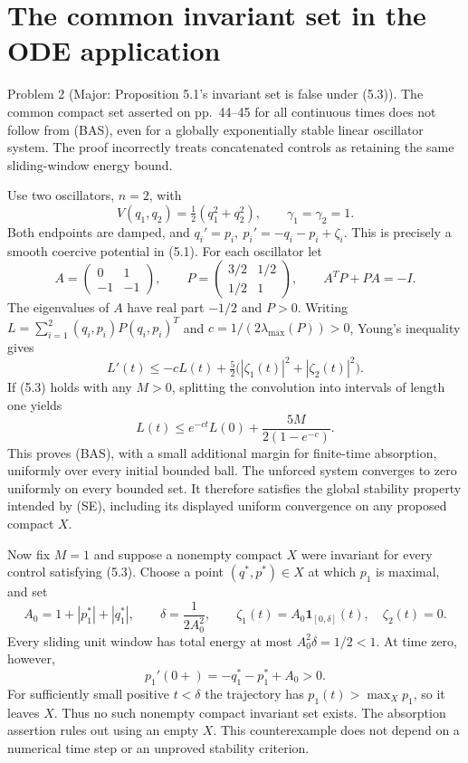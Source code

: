 \documentclass[10pt]{article}
\begin{document}
\section*{The common invariant set in the ODE application}
Problem 2 (Major: Proposition 5.1’s invariant set is false under (5.3)).  The common compact set asserted on pp. 44–45 for all continuous times does not follow from (BAS), even for a globally exponentially stable linear oscillator system. The proof incorrectly treats concatenated controls as retaining the same sliding-window energy bound.\par
Use two oscillators, \(n=2\), with \[V(q_1,q_2)=\tfrac12(q_1^2+q_2^2),\qquad \gamma_1=\gamma_2=1.\] Both endpoints are damped, and \(q_i'=p_i,\ p_i'=-q_i-p_i+\zeta_i\). This is precisely a smooth coercive potential in (5.1). For each oscillator let \[A=\begin{pmatrix}0&1\\-1&-1\end{pmatrix},\qquad
 P=\begin{pmatrix}3/2&1/2\\1/2&1\end{pmatrix},\qquad
 A^{T}P+PA=-I.\] The eigenvalues of \(A\) have real part \(-1/2\) and \(P>0\). Writing \(L=\sum_{i=1}^2(q_i,p_i)P(q_i,p_i)^T\) and \(c=1/(2\lambda_{\max}(P))>0\), Young’s inequality gives \[L'(t)\leq-cL(t)+\tfrac52\bigl(|\zeta_1(t)|^2+|\zeta_2(t)|^2\bigr).\] If (5.3) holds with any \(M>0\), splitting the convolution into intervals of length one yields \[L(t)\leq e^{-ct}L(0)+\frac{5M}{2(1-e^{-c})}.\] This proves (BAS), with a small additional margin for finite-time absorption, uniformly over every initial bounded ball. The unforced system converges to zero uniformly on every bounded set. It therefore satisfies the global stability property intended by (SE), including its displayed uniform convergence on any proposed compact \(X\).\par
Now fix \(M=1\) and suppose a nonempty compact \(X\) were invariant for every control satisfying (5.3). Choose a point \((q^*,p^*)\in X\) at which \(p_1\) is maximal, and set \[A_0=1+|p_1^*|+|q_1^*|,\qquad
 \delta=\frac1{2A_0^2},\qquad
 \zeta_1(t)=A_0\mathbf1_{[0,\delta]}(t),\quad \zeta_2(t)=0.\] Every sliding unit window has total energy at most \(A_0^2\delta=1/2<1\). At time zero, however, \[p_1'(0+)=-q_1^*-p_1^*+A_0>0.\] For sufficiently small positive \(t<\delta\) the trajectory has \(p_1(t)>\max_Xp_1\), so it leaves \(X\). Thus no such nonempty compact invariant set exists. The absorption assertion rules out using an empty \(X\). This counterexample does not depend on a numerical time step or an unproved stability criterion.\par
\end{document}
